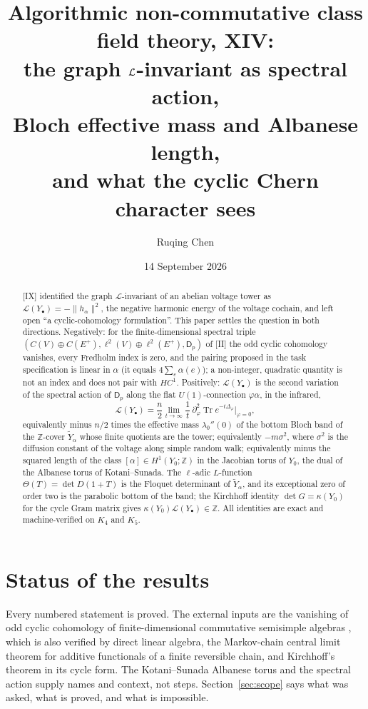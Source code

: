 \documentclass[11pt]{amsart}
\title[Algorithmic non-commutative class field theory, XIV]
{Algorithmic non-commutative class field theory, XIV:\\
the graph $\cL$-invariant as spectral action,\\ Bloch effective mass and Albanese length,\\
and what the cyclic Chern character sees}
\author{Ruqing Chen}
\date{14 September 2026}
\numberwithin{equation}{section}
\theoremstyle{definition}
\theoremstyle{remark}
\newcommand{\Z}{\mathbb{Z}}
\newcommand{\cL}{\mathcal{L}}
\newcommand{\Dp}{\mathsf{D}_p}
\newcommand{\Tr}{\operatorname{Tr}}
\newcommand{\HC}{\mathit{HC}}
\begin{document}
\begin{abstract}
[IX] identified the graph $\cL$-invariant of an abelian voltage tower as
$\cL(Y_\bullet)=-\|h_\alpha\|^{2}$, the negative harmonic energy of the voltage cochain, and
left open ``a cyclic-cohomology formulation''. This paper settles the question in both
directions. Negatively: for the finite-dimensional spectral triple
$(C(V)\oplus C(E^{+}),\ell^{2}(V)\oplus\ell^{2}(E^{+}),\Dp)$ of [II] the odd cyclic
cohomology vanishes, every Fredholm index is zero, and the pairing proposed in the task
specification is linear in $\alpha$ (it equals $4\sum_e\alpha(e)$); a non-integer, quadratic
quantity is not an index and does not pair with $\HC^{1}$. Positively: $\cL(Y_\bullet)$ is
the second variation of the spectral action of $\Dp$ along the flat $U(1)$-connection
$\varphi\alpha$, in the infrared,
\[
\cL(Y_\bullet)=\frac n2\lim_{t\to\infty}\frac1t\,\partial_\varphi^{2}\Tr e^{-t\Delta_\varphi}\Big|_{\varphi=0},
\]
equivalently minus $n/2$ times the effective mass $\lambda_0''(0)$ of the bottom Bloch band
of the $\Z$-cover $\widetilde Y_\alpha$ whose finite quotients are the tower; equivalently
$-m\sigma^{2}$, where $\sigma^{2}$ is the diffusion constant of the voltage along simple
random walk; equivalently minus the squared length of the class $[\alpha]\in H^{1}(Y_0;\Z)$
in the Jacobian torus of $Y_0$, the dual of the Albanese torus of Kotani--Sunada. The
$\ell$-adic $L$-function $\Theta(T)=\det D(1+T)$ is the Floquet determinant of
$\widetilde Y_\alpha$, and its exceptional zero of order two is the parabolic bottom of the
band; the Kirchhoff identity $\det G=\kappa(Y_0)$ for the cycle Gram matrix gives
$\kappa(Y_0)\cL(Y_\bullet)\in\Z$. All identities are exact and machine-verified on $K_4$
and $K_5$.
\end{abstract}

\maketitle

\section*{Status of the results}

Every numbered statement is proved. The external inputs are the vanishing of odd cyclic
cohomology of finite-dimensional commutative semisimple algebras \cite[Ch.~2]{Lo}, which is
also verified by direct linear algebra, the Markov-chain central limit theorem for
additive functionals of a finite reversible chain, and Kirchhoff's theorem in its cycle
form. The Kotani--Sunada Albanese torus \cite{KS1,KS2} and the spectral action
\cite{CC,JLO,Co} supply names and context, not steps. Section~\ref{sec:scope} says what
was asked, what is proved, and what is impossible.
\end{document}
